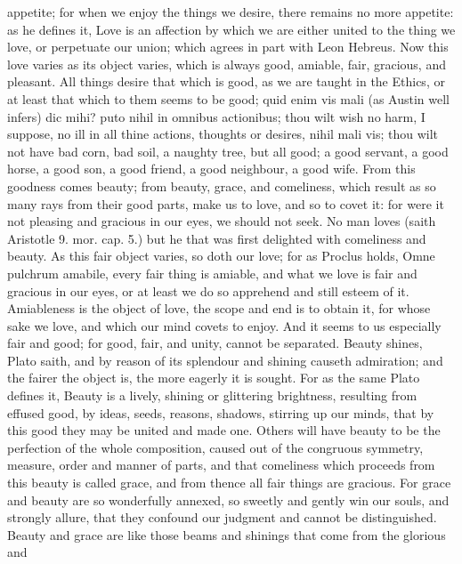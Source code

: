 {appetite; for when we enjoy the things we desire, there remains no more
appetite: as he defines it, Love is an affection by which we are either
united to the thing we love, or perpetuate our union; which agrees in
part with Leon Hebreus.
Now this love varies as its object varies, which is always good,
amiable, fair, gracious, and pleasant. All things desire that
which is good, as we are taught in the Ethics, or at least that which
to them seems to be good; quid enim vis mali (as Austin well infers)
dic mihi? puto nihil in omnibus actionibus; thou wilt wish no harm, I
suppose, no ill in all thine actions, thoughts or desires, nihil mali
vis; thou wilt not have bad corn, bad soil, a naughty tree, but
all good; a good servant, a good horse, a good son, a good friend, a
good neighbour, a good wife. From this goodness comes beauty; from
beauty, grace, and comeliness, which result as so many rays from their
good parts, make us to love, and so to covet it: for were it not
pleasing and gracious in our eyes, we should not seek. No man
loves (saith Aristotle 9. mor. cap. 5.) but he that was first delighted
with comeliness and beauty. As this fair object varies, so doth our
love; for as Proclus holds, Omne pulchrum amabile, every fair thing is
amiable, and what we love is fair and gracious in our eyes, or at least
we do so apprehend and still esteem of it.  Amiableness is the
object of love, the scope and end is to obtain it, for whose sake we
love, and which our mind covets to enjoy. And it seems to us especially
fair and good; for good, fair, and unity, cannot be separated. Beauty
shines, Plato saith, and by reason of its splendour and shining causeth
admiration; and the fairer the object is, the more eagerly it is
sought. For as the same Plato defines it, Beauty is a lively,
shining or glittering brightness, resulting from effused good, by
ideas, seeds, reasons, shadows, stirring up our minds, that by this
good they may be united and made one. Others will have beauty to be the
perfection of the whole composition, caused out of the congruous
symmetry, measure, order and manner of parts, and that comeliness which
proceeds from this beauty is called grace, and from thence all fair
things are gracious. For grace and beauty are so wonderfully annexed,
so sweetly and gently win our souls, and strongly allure, that
they confound our judgment and cannot be distinguished. Beauty and
grace are like those beams and shinings that come from the glorious and
}
